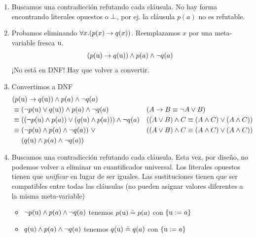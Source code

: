 \begin{ejemplo}
\begin{enumerate}
        \item Buscamos una contradicción refutando cada cláusula. No hay forma
        encontrando literales opuestos o $\bot$, por ej. la cláusula
        $p(a)$ no es refutable.
        \item Probamos eliminando $\forall x. (p(x) \to q(x))$. Reemplazamos
        $x$ por una meta-variable fresca $\textrm{u}$.
        \[
            (p(\textrm{u}) \to q(\textrm{u})) \wedge p(a) \wedge \neg q(a)
        \]
        ¡No está en DNF! Hay que volver a convertir.
        \item Convertimos a DNF
        \begin{align*}
            &(p(\metavar{u}) \fImp q(\metavar{u})) \fAnd p(a) \fAnd \fNot q(a)\\
            &\equiv (\fNot p(\metavar{u}) \fOr q(\metavar{u})) \fAnd p(a) \fAnd \fNot q(a)
            &&(\form \to \formTwo \equiv \fNot \form \fOr \formTwo)\\
            &\equiv ( (\fNot p(\metavar{u}) \fAnd p(a)) \fOr (q(\metavar{u}) \fAnd p(a))) \fAnd \fNot q(a)
            &&((\form \fOr \formTwo) \fAnd \formThree \equiv (\form \fAnd \formThree) \fOr (\form \fAnd \formThree))\\
            &\equiv 
            \begin{aligned}[t]
                &(\fNot p(\metavar{u}) \fAnd p(a) \fAnd \fNot q(a))\ \fOr\\
                &(q(\metavar{u}) \fAnd p(a)\fAnd \fNot q(a))
            \end{aligned}
            &&((\form \fOr \formTwo) \fAnd \formThree \equiv (\form \fAnd \formThree) \fOr (\form \fAnd \formThree))
        \end{align*}
        \item Buscamos una contradicción refutando cada cláusula. Esta vez, por diseño, no
        podemos volver a eliminar un cuantificador universal. Los
        literales opuestos tienen que \textit{unificar} en lugar de ser iguales.
        Las sustituciones tienen que ser compatibles entre todas las cláusulas
        (no pueden asignar valores diferentes a la misma meta-variable)
        \begin{itemize}
            \item $\neg p(\textrm{u}) \wedge p(a) \wedge \neg q(a)$ tenemos $p(\textrm{u}) \doteq p(a)$ con $\{\textrm{u} := a\}$
            \item $q(\textrm{u}) \wedge p(a) \wedge \neg q(a)$ tenemos $q(\textrm{u}) \doteq q(a)$ con $\{\textrm{u} := a\}$
        \end{itemize}
    \end{enumerate}
\end{ejemplo}

